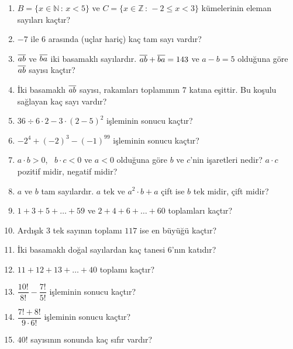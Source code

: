 \begin{enumerate}[label=\textbf{\arabic*.},leftmargin=*,itemsep=6pt]
\item \(B=\{x\in\mathbb{N}\,:\,x<5\}\) ve \(C=\{x\in\mathbb{Z}\,:\,-2\le x<3\}\) kümelerinin eleman sayıları kaçtır?
\item \(-7\) ile \(6\) arasında (uçlar hariç) kaç tam sayı vardır?
\item \(\overline{ab}\) ve \(\overline{ba}\) iki basamaklı sayılardır. \(\overline{ab}+\overline{ba}=143\) ve \(a-b=5\) olduğuna göre \(\overline{ab}\) sayısı kaçtır?
\item İki basamaklı \(\overline{ab}\) sayısı, rakamları toplamının \(7\) katına eşittir. Bu koşulu sağlayan kaç sayı vardır?
\item \(36\div 6\cdot 2-3\cdot(2-5)^2\) işleminin sonucu kaçtır?
\item \(-2^4+(-2)^3-(-1)^{99}\) işleminin sonucu kaçtır?
\item \(a\cdot b>0\), \ \(b\cdot c<0\) ve \(a<0\) olduğuna göre \(b\) ve \(c\)'nin işaretleri nedir? \(a\cdot c\) pozitif midir, negatif midir?
\item \(a\) ve \(b\) tam sayılardır. \(a\) tek ve \(a^2\cdot b+a\) çift ise \(b\) tek midir, çift midir?
\item \(1+3+5+\dots+59\) ve \(2+4+6+\dots+60\) toplamları kaçtır?
\item Ardışık \(3\) tek sayının toplamı \(117\) ise en büyüğü kaçtır?
\item İki basamaklı doğal sayılardan kaç tanesi \(6\)'nın katıdır?
\item \(11+12+13+\dots+40\) toplamı kaçtır?
\item \(\dfrac{10!}{8!}-\dfrac{7!}{5!}\) işleminin sonucu kaçtır?
\item \(\dfrac{7!+8!}{9\cdot 6!}\) işleminin sonucu kaçtır?
\item \(40!\) sayısının sonunda kaç sıfır vardır?
\end{enumerate}


